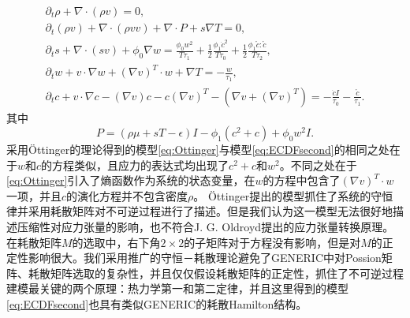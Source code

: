 	\begin{subequations}\label{eq:Ottinger}
		\begin{align} 
			\partial_t \rho + \nabla \cdot (\rho v) = 0, \\
			\partial_t (\rho v) + \nabla \cdot (\rho v v ) + \nabla \cdot P + s \nabla T = 0, \\
			\partial_t s + \nabla \cdot (s v) + \phi_0  \nabla w = \frac{\phi_0 w^2}{T \tau_1} + \frac{1}{2} \frac{\phi_1 \dot{c}^2}{T \tau_0} + \frac{1}{2} \frac{\phi_1 \mathring{c}:\mathring{c}}{T \tau_2}, \\
			\partial_t w + v \cdot \nabla w + (\nabla v)^T \cdot w + \nabla T  = -\frac{w}{\tau_1}, \\
			\partial_t c + v \cdot \nabla c - (\nabla v) c - c (\nabla v)^T - (\nabla v + (\nabla v)^T) = -\frac{\dot{c}I}{\tau_0} - \frac{\mathring{c}}{\tau_1}.
		\end{align}
	\end{subequations}
	其中
	\begin{equation*}
		P = (\rho \mu + sT - \epsilon) I  - \phi_1(c^2 + c) + \phi_0 w^2 I.
	\end{equation*}
	采用\"Ottinger的理论得到的模型\eqref{eq:Ottinger}与模型\eqref{eq:ECDFsecond}的相同之处在于$w$和$c$的方程类似，且应力的表达式均出现了$c^2+c$和$w^2$。不同之处在于\eqref{eq:Ottinger}引入了熵函数作为系统的状态变量，在$w$的方程中包含了$(\nabla v)^T \cdot w$一项，并且$c$的演化方程并不包含密度$\rho$。
	\"Ottinger提出的模型抓住了系统的守恒律并采用耗散矩阵对不可逆过程进行了描述。但是我们认为这一模型无法很好地描述压缩性对应力张量的影响，也不符合J. G. Oldroyd提出的应力张量转换原理\cite{oldroyd1950formulation}。在耗散矩阵$M$的选取中，右下角$2\times 2$的子矩阵对于方程没有影响，但是对$M$的正定性影响很大。我们采用推广的守恒－耗散理论避免了GENERIC中对Possion矩阵、耗散矩阵选取的复杂性，并且仅仅假设耗散矩阵的正定性，抓住了不可逆过程建模最关键的两个原理：热力学第一和第二定律，并且这里得到的模型\eqref{eq:ECDFsecond}也具有类似GENERIC的耗散Hamilton结构。%


